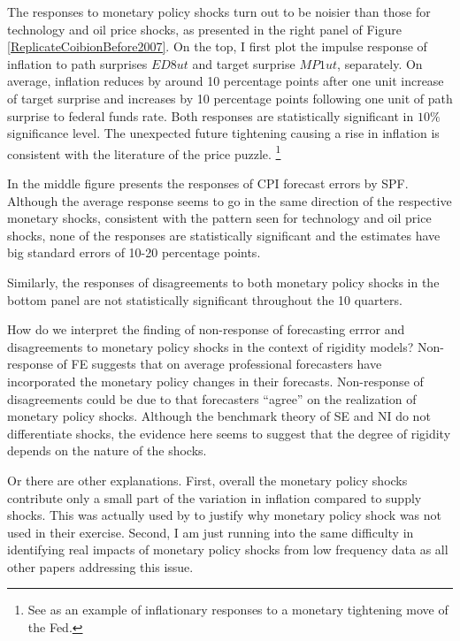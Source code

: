 \documentclass[]{article}
\begin{document}
	The responses to monetary policy shocks turn out to be noisier than those for technology and oil price shocks, as presented in the right panel of Figure \ref{ReplicateCoibionBefore2007}. On the top, I first plot the impulse response of inflation to path surprises $ED8ut$ and target surprise $MP1ut$, separately. On average, inflation reduces by around 10 percentage points after one unit increase of target surprise and increases by 10 percentage points following one unit of path surprise to federal funds rate. Both responses are  statistically significant in $10\%$  significance level. The unexpected future tightening causing a rise in inflation is consistent with the literature of the price puzzle. \footnote{See \cite{nakamura2018high} as an example of inflationary responses to a monetary tightening move of the Fed.}
	
	In the middle figure presents the responses of CPI forecast errors by SPF.  Although the average response seems to go in the same direction of the respective monetary shocks, consistent with the pattern seen for technology and oil price shocks, none of the responses are statistically significant and the estimates have big standard errors of 10-20 percentage points.  
	
	Similarly, the responses of disagreements to both monetary policy shocks in the bottom panel are not statistically significant throughout the 10 quarters.  
	
	How do we interpret the finding of non-response of forecasting errror and disagreements to monetary policy shocks in the context of rigidity models? Non-response of FE suggests that on average professional forecasters have incorporated the monetary policy changes in their forecasts. Non-response of disagreements could be due to that forecasters ``agree'' on the realization of monetary policy shocks. Although the benchmark theory of SE and NI do not differentiate shocks, the evidence here seems to suggest that the degree of rigidity depends on the nature of the shocks. 
	
	Or there are other explanations.  First, overall the monetary policy shocks contribute only a small part of the variation in inflation compared to supply shocks. This was actually used by \cite{coibion2012can} to justify why monetary policy shock was not used in their exercise.  Second,  I am just running into the same difficulty in identifying real impacts of monetary policy shocks from low frequency data as all other papers addressing this issue. 
	
\end{document}
